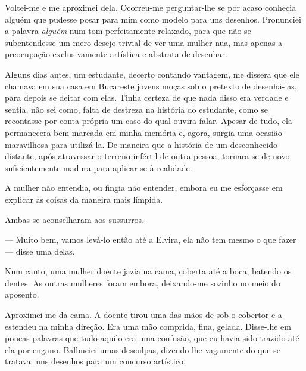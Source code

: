 Voltei-me e me aproximei dela. Ocorreu-me perguntar-lhe se por acaso conhecia
alguém que pudesse posar para mim como modelo para uns desenhos. Pronunciei a
palavra \textit{alguém} num tom perfeitamente relaxado, para que não se
subentendesse um mero desejo trivial de ver uma mulher nua, mas apenas a
preocupação exclusivamente artística e abstrata de desenhar.

Alguns dias antes, um estudante, decerto contando vantagem, me dissera que ele
chamava em sua casa em Bucareste jovens moças sob o pretexto de desenhá-las,
para depois se deitar com elas. Tinha certeza de que nada disso era verdade e
sentia, não sei como, falta de destreza na história do estudante, como se
recontasse por conta própria um caso do qual ouvira falar. Apesar de tudo,
ela permanecera bem marcada em minha memória e, agora, surgia uma ocasião
maravilhosa para utilizá-la. De maneira que a história de um desconhecido
distante, após atravessar o terreno infértil de outra pessoa, tornara-se de
novo suficientemente madura para aplicar-se à realidade.

A mulher não entendia, ou fingia não entender, embora eu me esforçasse em
explicar as coisas da maneira mais límpida.


Ambas se aconselharam aos sussurros.

--- Muito bem, vamos levá-lo então até a Elvira, ela não tem mesmo o que
    fazer --- disse uma delas.


Num canto, uma mulher doente jazia na cama, coberta até a boca, batendo os
dentes. As outras mulheres foram embora, deixando-me sozinho no meio do
aposento.

Aproximei-me da cama. A doente tirou uma das mãos de sob o cobertor e a
estendeu na minha direção. Era uma mão comprida, fina, gelada. Disse-lhe em
poucas palavras que tudo aquilo era uma confusão, que eu havia sido trazido
até ela por engano. Balbuciei umas desculpas, dizendo-lhe vagamente do que se
tratava: uns desenhos para um concurso artístico.

